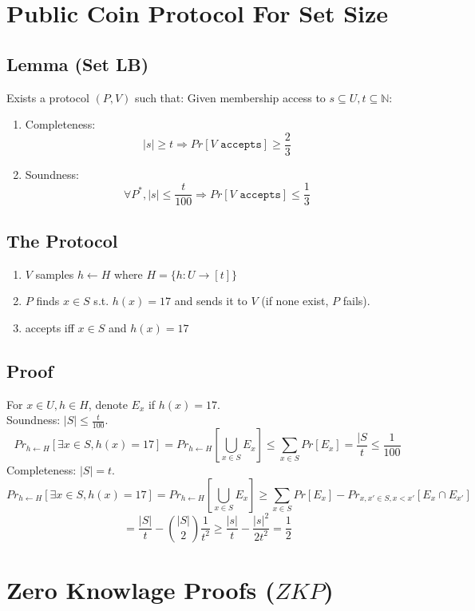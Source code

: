 \section*{Public Coin Protocol For Set Size}
\subsection*{Lemma (Set LB)}
Exists a protocol $(P,V)$ such that:
Given membership access to $s\subseteq U, t\subseteq \mathbb{N}$:
\begin{enumerate}
	\item Completeness:
	\[|s|\geq t\Rightarrow Pr[V \texttt{ accepts}]\geq \frac{2}{3}\]
	\item Soundness:
	\[\forall P^*, |s|\leq \frac{t}{100}\Rightarrow Pr[V \texttt{ accepts}]\leq \frac{1}{3}\]
\end{enumerate}


\subsection*{The Protocol}
\begin{enumerate}
	\item $V$ samples $h\leftarrow H$ where $H=\{h:U\rightarrow [t]\}$
	\item $P$ finds $x\in S$ s.t. $h(x)=17$ and sends it to $V$ (if none exist, $P$ fails).
	\item accepts iff $x\in S$ and $h(x) = 17$
\end{enumerate}

\subsection*{Proof}
For $x\in U, h\in H$, denote $E_x$ if $h(x)=17$.\\
Soundness: $|S|\leq\frac{t}{100}$.\\
\[
	Pr_{h\leftarrow H}[\exists x\in S, h(x)=17]
	=Pr_{h\leftarrow H}[\bigcup_{x\in S}E_x]
	\leq\sum_{x\in S}Pr[E_x]
	=\frac{|S}{t}
	\leq\frac{1}{100}
\]
Completeness: $|S|=t$.\\
\[
	Pr_{h\leftarrow H}[\exists x\in S, h(x)=17]
	=Pr_{h\leftarrow H}[\bigcup_{x\in S}E_x]
	\geq\sum_{x\in S}Pr[E_x]-Pr_{x,x'\in S, x<x'}[E_x\cap E_{x'}]
\]\[
	=\frac{|S|}{t}-\binom{|S|}{2}\frac{1}{t^2}
	\geq \frac{|s|}{t}-\frac{|s|^2}{2t^2}=\frac{1}{2}
\]

\section*{Zero Knowlage Proofs ($ZKP$)}
